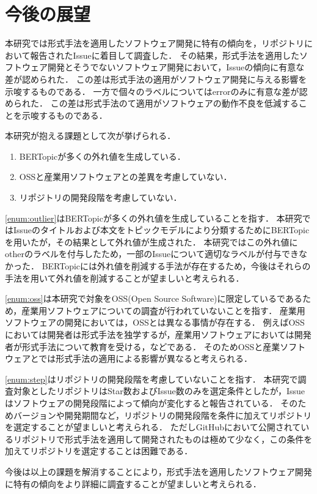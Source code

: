 \documentclass[main]{subfiles}
\begin{document}
\chapter{今後の展望}

本研究では形式手法を適用したソフトウェア開発に特有の傾向を，リポジトリにおいて報告されたIssueに着目して調査した．
その結果，形式手法を適用したソフトウェア開発とそうでないソフトウェア開発において，Issueの傾向に有意な差が認められた．
この差は形式手法の適用がソフトウェア開発に与える影響を示唆するものである．
一方で個々のラベルについてはerrorのみに有意な差が認められた．
この差は形式手法のて適用がソフトウェアの動作不良を低減することを示唆するものである．

本研究が抱える課題として次が挙げられる．

\begin{enumerate}[label=課題\arabic*.]
	\item \label{enum:outlier} BERTopicが多くの外れ値を生成している．
	\item \label{enum:oss} OSSと産業用ソフトウェアとの差異を考慮していない．
	\item \label{enum:step} リポジトリの開発段階を考慮していない．
\end{enumerate}

\ref{enum:outlier}はBERTopicが多くの外れ値を生成していることを指す．
本研究ではIssueのタイトルおよび本文をトピックモデルにより分類するためにBERTopicを用いたが，その結果として外れ値が生成された．
本研究ではこの外れ値にotherのラベルを付与したため，一部のIssueについて適切なラベルが付与できなかった．
BERTopicには外れ値を削減する手法が存在するため，今後はそれらの手法を用いて外れ値を削減することが望ましいと考えられる．

\ref{enum:oss}は本研究で対象をOSS(Open Source Software)に限定しているであるため，産業用ソフトウェアについての調査が行われていないことを指す．
産業用ソフトウェアの開発においては，OSSとは異なる事情が存在する．
例えばOSSにおいては開発者は形式手法を独学するが，産業用ソフトウェアにおいては開発者が形式手法について教育を受ける，などである．
そのためOSSと産業ソフトウェアとでは形式手法の適用による影響が異なると考えられる．

\ref{enum:step}はリポジトリの開発段階を考慮していないことを指す．
本研究で調査対象としたリポジトリはStar数およびIssue数のみを選定条件としたが，Issueはソフトウェアの開発段階によって傾向が変化すると報告されている\cite{bissyande:2013}．
そのためバージョンや開発期間など，リポジトリの開発段階を条件に加えてリポジトリを選定することが望ましいと考えられる．
ただしGitHubにおいて公開されているリポジトリで形式手法を適用して開発されたものは極めて少なく，この条件を加えてリポジトリを選定することは困難である．

今後は以上の課題を解消することにより，形式手法を適用したソフトウェア開発に特有の傾向をより詳細に調査することが望ましいと考えられる．
\end{document}

